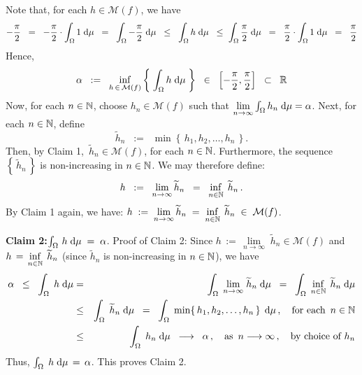 \begin{enumerate}
\vskip 0.8cm
\noindent
Note that, for each $h \in \mathcal{M}(f)$, we have
\begin{equation*}
-\dfrac{\pi}{2}
\;\;=\;\; -\dfrac{\pi}{2} \cdot \int_{\Omega} 1\;\textnormal{d}\mu
\;\;=\;\; \int_{\Omega} -\dfrac{\pi}{2} \;\textnormal{d}\mu
\;\;\leq\;\; \int_{\Omega} h \;\textnormal{d}\mu
\;\;\leq\; \int_{\Omega} \dfrac{\pi}{2} \;\textnormal{d}\mu
\;\;=\;\; \dfrac{\pi}{2} \cdot \int_{\Omega} 1\;\textnormal{d}\mu
\;\;=\;\; \dfrac{\pi}{2}
\end{equation*}
Hence,
\begin{equation*}
\alpha
\;\; := \;\; \underset{h\,\in\,\mathcal{M}(f)}{\inf}\left\{\;\int_{\Omega}h\;\textnormal{d}\mu\;\right\}
\;\;\in\;\; \left[-\dfrac{\pi}{2},\dfrac{\pi}{2}\right]
\;\;\subset\;\; \mathbb{R}
\end{equation*}
Now, for each $n \in \mathbb{N}$, choose $h_{n} \in \mathcal{M}(f)$ such that
$\underset{n\rightarrow\infty}{\lim}\int_{\Omega}h_{n}\;\textnormal{d}\mu = \alpha$.
Next, for each $n \in \mathbb{N}$, define
\begin{equation*}
\widetilde{h}_{n} \;\; := \;\; \min\!\left\{\,h_{1},h_{2},\ldots,h_{n}\,\right\}.
\end{equation*}
Then, by Claim 1, \,$\widetilde{h}_{n} \in \mathcal{M}(f)$, for each $n \in \mathbb{N}$.
Furthermore, the sequence $\left\{\,\widetilde{h}_{n}\,\right\}$ is non-increasing in $n \in \mathbb{N}$.
We may therefore define:
\begin{equation*}
h
\;\; := \;\; \underset{n\rightarrow\infty}{\lim}\,\widetilde{h}_{n}
\;\; = \;\; \underset{n\in\mathbb{N}}{\inf}\;\,\widetilde{h}_{n}\,.
\end{equation*}
By Claim 1 again, we have:
$h \; := \; \underset{n\rightarrow\infty}{\lim}\,\widetilde{h}_{n} \; = \; \underset{n\in\mathbb{N}}{\inf}\;\,\widetilde{h}_{n} \; \in \; \mathcal{M}(f)$.

\vskip 0.8cm
\noindent
\textbf{Claim 2:}\quad $\int_{\Omega}\, h \; \textnormal{d}\mu \; = \; \alpha$.
\vskip 0.1cm
\noindent
Proof of Claim 2:\;\;
Since $h \,:=\, \underset{n\rightarrow\infty}{\lim}\;\widetilde{h}_{n} \in \mathcal{M}(f)$ and
$h \,=\, \underset{n\in\mathbb{N}}{\inf}\;\,\widetilde{h}_{n}$ (since $\widetilde{h}_{n}$ is non-increasing in $n \in \mathbb{N}$),
we have
\begin{eqnarray*}
\alpha
\;\;\leq\;\;
	\int_{\Omega}\;h\;\textnormal{d}\mu
&=&
	\int_{\Omega}\;\underset{n\rightarrow\infty}{\lim}\;\widetilde{h}_{n}\;\textnormal{d}\mu
\;\;=\;\;
	\int_{\Omega}\;\underset{n\in\mathbb{N}}{\inf}\;\,\widetilde{h}_{n}\;\textnormal{d}\mu
\\
&\leq&
	\int_{\Omega}\;\widetilde{h}_{n}\;\textnormal{d}\mu
\;\;=\;\;
	\int_{\Omega}\;\min\!\left\{\,h_{1},h_{2},\ldots,h_{n}\,\right\}\;\textnormal{d}\mu\,,
	\quad\textnormal{for each \,$n \in \mathbb{N}$}
\\
&\leq&
	\int_{\Omega}\;h_{n}\;\textnormal{d}\mu
\;\;\longrightarrow\;\;
	\alpha\,,
	\quad\textnormal{as \,$n \longrightarrow \infty$}\,,
	\quad\textnormal{by choice of $h_{n}$}
\end{eqnarray*}
Thus, \;$\int_{\Omega}\;h\;\textnormal{d}\mu \,=\, \alpha$.\; This proves Claim 2.


\end{enumerate}
